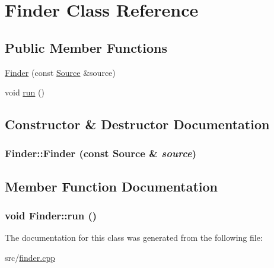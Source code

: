 \hypertarget{class_finder}{
\section{Finder Class Reference}
\label{class_finder}
}
\subsection*{Public Member Functions}
\begin{DoxyCompactItemize}
\item 
\hyperlink{class_finder_a26a4356e33a752b46f2fe773cfebd58a}{Finder} (const \hyperlink{class_source}{Source} \&source)
\item 
void \hyperlink{class_finder_a444b55731e2ec784447009b40ecdb577}{run} ()
\end{DoxyCompactItemize}


\subsection{Constructor \& Destructor Documentation}
\hypertarget{class_finder_a26a4356e33a752b46f2fe773cfebd58a}{
\subsubsection[{Finder}]{\setlength{\rightskip}{0pt plus 5cm}Finder::Finder (const {\bf Source} \& {\em source})}}
\label{class_finder_a26a4356e33a752b46f2fe773cfebd58a}


\subsection{Member Function Documentation}
\hypertarget{class_finder_a444b55731e2ec784447009b40ecdb577}{
\subsubsection[{run}]{\setlength{\rightskip}{0pt plus 5cm}void Finder::run ()}}
\label{class_finder_a444b55731e2ec784447009b40ecdb577}


The documentation for this class was generated from the following file:\begin{DoxyCompactItemize}
\item 
src/\hyperlink{finder_8cpp}{finder.cpp}\end{DoxyCompactItemize}

